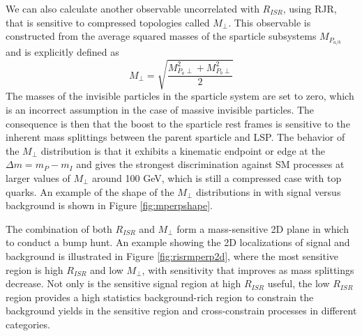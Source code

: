 
We can also calculate another observable uncorrelated with $R_{ISR}$, using RJR, that is sensitive to compressed topologies called $M_\perp$. This observable is constructed from the average squared masses of the sparticle subsystems $M_{P_{a/b}}$ and is explicitly defined as
\begin{equation}
M_\perp = \sqrt{\frac{M_{P_a\perp}^2 + M_{P_b\perp}^2}{2}}
\end{equation}
The masses of the invisible particles in the sparticle system are set to zero, which is an incorrect assumption in the case of massive invisible particles. The consequence is then that the boost to the sparticle rest frames is sensitive to the inherent mass splittings between the parent sparticle and LSP. The behavior of the $M_\perp$ distribution is that it exhibits a kinematic endpoint or edge at the $\Delta m = m_P - m_I$ and gives the strongest discrimination against SM processes at larger values of $M_\perp$ around 100 GeV, which is still a compressed case with top quarks. An example of the shape of the $M_\perp$ distributions in with signal versus background is shown in Figure \ref{fig:mperpshape}.


The combination of both $R_{ISR}$ and $M_\perp$ form a mass-sensitive 2D plane in which to conduct a bump hunt. An example showing the 2D localizations of signal and background is illustrated in Figure \ref{fig:risrmperp2d}, where the most sensitive region is high $R_{ISR}$ and low $M_\perp$, with sensitivity that improves as mass splittings decrease. Not only is the sensitive signal region at high $R_{ISR}$ useful, the low $R_{ISR}$ region provides a high statistics background-rich region to constrain the background yields in the sensitive region and cross-constrain processes in different categories. 


